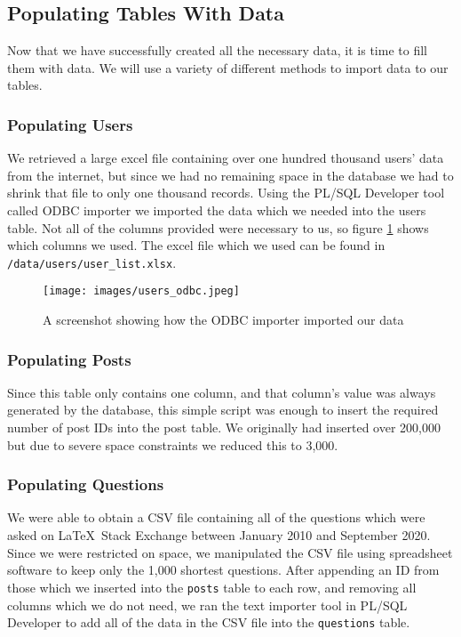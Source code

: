 \subsection{Populating Tables With Data}

Now that we have successfully created all the necessary data, it is time to fill them with data. We will use a variety of different methods to import data to our tables.

\subsubsection{Populating Users}

We retrieved a large excel file containing over one hundred thousand users' data from the internet, but since we had no remaining space in the database we had to shrink that file to only one thousand records. Using the PL/SQL Developer tool called ODBC importer we imported the data which we needed into the users table. Not all of the columns provided were necessary to us, so figure \ref{users-odbc} shows which columns we used. The excel file which we used can be found in \verb`/data/users/user_list.xlsx`.

\begin{figure}[hbtp]
	\centering
	\texttt{[image: images/users\_odbc.jpeg]}
	\caption{A screenshot showing how the ODBC importer imported our data}
	\label{users-odbc}
\end{figure}

\subsubsection{Populating Posts}

Since this table only contains one column, and that column's value was always generated by the database, this simple script was enough to insert the required number of post IDs into the post table. We originally had inserted over 200,000 but due to severe space constraints we reduced this to 3,000.


\subsubsection{Populating Questions}

We were able to obtain a CSV file containing all of the questions which were asked on \LaTeX\ Stack Exchange between January 2010 and September 2020. Since we were restricted on space, we manipulated the CSV file using spreadsheet software to keep only the 1,000 shortest questions. After appending an ID from those which we inserted into the \verb`posts` table to each row, and removing all columns which we do not need, we ran the text importer tool in PL/SQL Developer to add all of the data in the CSV file into the \verb`questions` table.

